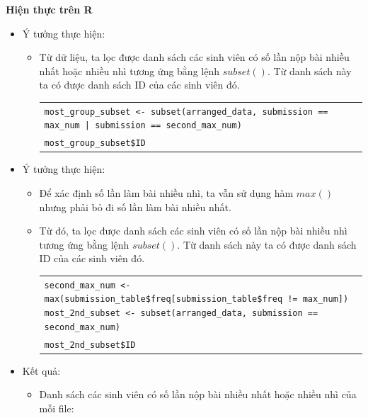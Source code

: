 \documentclass[a4paper]{article}
\theoremstyle{definition}
\begin{document}
\begin{enumerate}[a)]
\begin{itemize}
\begin{itemize}
        \end{itemize}
    \end{itemize}
    \bf Hiện thực trên R\normalfont
    \begin{itemize}
        \item Ý tưởng thực hiện:
        \begin{itemize}
            \item Từ dữ liệu, ta lọc được danh sách các sinh viên có số lần nộp bài nhiều nhất hoặc nhiều nhì tương ứng bằng lệnh $subset()$. Từ danh sách này ta có được danh sách ID của các sinh viên đó.
            \begin{center}
                \begin{tabular}{p{13cm}}
                    \texttt{most\_group\_subset <- subset(arranged\_data, submission == max\_num  | submission == second\_max\_num)}\\
                    \texttt{most\_group\_subset\$ID}
                \end{tabular}
            \end{center}
        \end{itemize}
        \item Ý tưởng thực hiện:
        \begin{itemize}
            \item Để xác định số lần làm bài nhiều nhì, ta vẫn sử dụng hàm $max()$ nhưng phải bỏ đi số lần làm bài nhiều nhất.
            \item Từ đó, ta lọc được danh sách các sinh viên có số lần nộp bài nhiều nhì tương ứng bằng lệnh $subset()$. Từ danh sách này ta có được danh sách ID của các sinh viên đó.
            \begin{center}
                \begin{tabular}{p{13cm}}
                    \texttt{second\_max\_num <- max(submission\_table\$freq[submission\_table\$freq != max\_num])}
                    \texttt{most\_2nd\_subset <- subset(arranged\_data, submission == second\_max\_num)}\\
                    \texttt{most\_2nd\_subset\$ID}
                \end{tabular}
            \end{center}
        \end{itemize}
        \item Kết quả:
        \begin{itemize}
            \item Danh sách các sinh viên có số lần nộp bài nhiều nhất hoặc nhiều nhì của mỗi file:

\end{itemize}
\end{itemize}
\end{enumerate}
\end{document}
